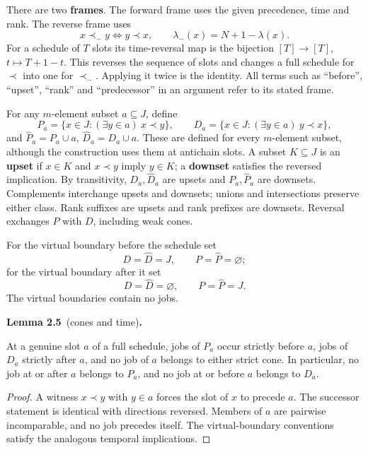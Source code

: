 \documentclass[11pt,a4paper]{article}
\theoremstyle{plain}
\theoremstyle{definition}
\newenvironment{numbered}[3]{\par\addvspace{\medskipamount}\Needspace{3\baselineskip}\noindent
  \textbf{#1 #2}\if\relax\detokenize{#3}\relax\else\ (#3)\fi\textbf{.}\ \itshape\ignorespaces}
  {\par\addvspace{\smallskipamount}}
\newcommand{\uses}[1]{\par\nopagebreak[4]\noindent{\small\textsf{Uses:} #1}\par\smallskip}
\begin{document}
There are two \textbf{frames}. The forward frame uses the given precedence, time and rank. The reverse frame uses \[
x\prec_- y\iff y\prec x,\qquad
\lambda_-(x)=N+1-\lambda(x).
\] For a schedule of \(T\) slots its time-reversal map is the bijection \([T]\to[T]\), \(t\mapsto T+1-t\). This reverses the sequence of slots and changes a full schedule for \(\prec\) into one for \(\prec_-\). Applying it twice is the identity. All terms such as ``before'', ``upset'', ``rank'' and ``predecessor'' in an argument refer to its stated frame.

For any \(m\)-element subset \(a\subseteq J\), define \[
P_a=\{x\in J:(\exists y\in a)\ x\prec y\},\qquad
D_a=\{x\in J:(\exists y\in a)\ y\prec x\},
\] and \(\widehat P_a=P_a\cup a\), \(\widehat D_a=D_a\cup a\). These are defined for every \(m\)-element subset, although the construction uses them at antichain slots. A subset \(K\subseteq J\) is an \textbf{upset} if \(x\in K\) and \(x\prec y\) imply \(y\in K\); a \textbf{downset} satisfies the reversed implication. By transitivity, \(D_a,\widehat D_a\) are upsets and \(P_a,\widehat P_a\) are downsets. Complements interchange upsets and downsets; unions and intersections preserve either class. Rank suffixes are upsets and rank prefixes are downsets. Reversal exchanges \(P\) with \(D\), including weak cones.

For the virtual boundary before the schedule set \[
D=\widehat D=J,\qquad P=\widehat P=\varnothing;
\] for the virtual boundary after it set \[
D=\widehat D=\varnothing,\qquad P=\widehat P=J.
\] The virtual boundaries contain no jobs.

\begin{numbered}{Lemma}{2.5}{cones and time}

At a genuine slot \(a\) of a full schedule, jobs of \(P_a\) occur strictly before \(a\), jobs of \(D_a\) strictly after \(a\), and no job of \(a\) belongs to either strict cone. In particular, no job at or after \(a\) belongs to \(P_a\), and no job at or before \(a\) belongs to \(D_a\).

\end{numbered}
\uses{definitions only.}

\begin{proof}
A witness \(x\prec y\) with \(y\in a\) forces the slot of \(x\) to precede \(a\). The successor statement is identical with directions reversed. Members of \(a\) are pairwise incomparable, and no job precedes itself. The virtual-boundary conventions satisfy the analogous temporal implications.
\end{proof}
\end{document}

